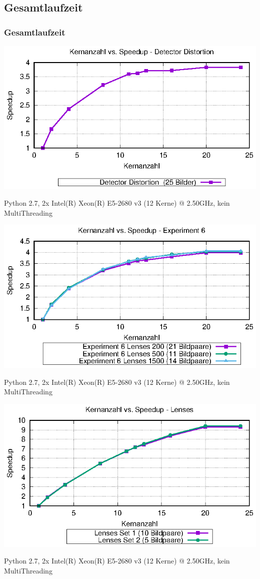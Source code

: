 \subsection{Gesamtlaufzeit}
\begin{frame}[allowframebreaks]
\frametitle{Gesamtlaufzeit}
	\includegraphics[width=0.9\linewidth]{img/times_detector_distortion}
	\begin{center}
		\scriptsize
		Python 2.7, 2x Intel(R) Xeon(R) E5-2680 v3 (12 Kerne) @ 2.50GHz, kein MultiThreading
	\end{center}
\framebreak
	\includegraphics[width=0.9\linewidth]{img/times_exp6}
	\begin{center}
		\scriptsize
		Python 2.7, 2x Intel(R) Xeon(R) E5-2680 v3 (12 Kerne) @ 2.50GHz, kein MultiThreading
	\end{center}
\framebreak
	\includegraphics[width=0.9\linewidth]{img/times_lenses}
	\begin{center}
		\scriptsize
		Python 2.7, 2x Intel(R) Xeon(R) E5-2680 v3 (12 Kerne) @ 2.50GHz, kein MultiThreading
	\end{center}
\framebreak
\end{frame}

